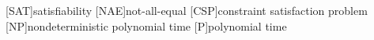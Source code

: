 


[SAT]{satisfiability}
[NAE]{not-all-equal}
[CSP]{constraint satisfaction problem}
[NP]{nondeterministic polynomial time}
[P]{polynomial time}

